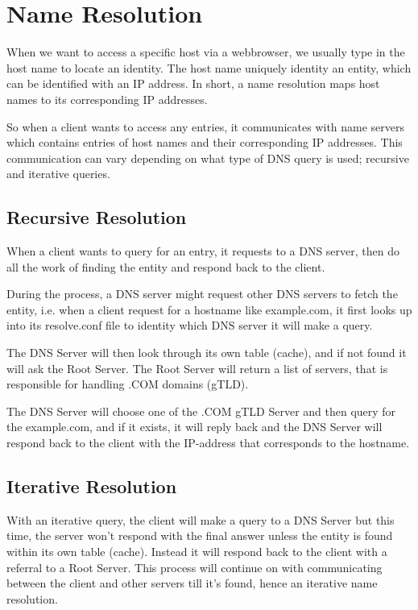\section{Name Resolution}

When we want to access a specific host via a webbrowser, we usually type in the host name to locate an identity. The host name uniquely identity an entity, which can be identified with an IP address. In short, a name resolution maps host names to its corresponding IP addresses.

So when a client wants to access any entries, it communicates with name servers which contains entries  of host names and their corresponding IP addresses. This communication can vary depending on what type of DNS query is used; recursive and iterative queries.

\subsection{Recursive Resolution}

When a client wants to query for an entry, it requests to a DNS server, then do all the work of finding the entity and respond back to the client.

During the process, a DNS server might request other DNS servers to fetch the entity, i.e. when a client request for a hostname like example.com, it first looks up into its resolve.conf file to identity which DNS server it will make a query.

The DNS Server will then look through its own table (cache), and if not found it will ask the Root Server. The Root Server will return a list of servers, that is responsible for handling .COM domains (gTLD).

The DNS Server will choose one of the .COM gTLD Server and then query for the example.com, and if it exists, it will reply back and the DNS Server will respond back to the client with the IP-address that corresponds to the hostname.

\subsection{Iterative Resolution}

With an iterative query, the client will make a query to a DNS Server but this time, the server won’t respond with the final answer unless the entity is found within its own table (cache). Instead it will respond back to the client with a referral to a Root Server. This process will continue on with communicating between the client and other servers till it’s found, hence an iterative name resolution.

